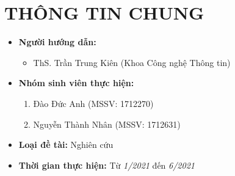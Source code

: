 \documentclass{article}[14pt]
\begin{document}
    \Large
    \section{THÔNG TIN CHUNG}
    \begin{itemize}[label = {}]
        
        \item \textbf{Người hướng dẫn:} 
        \begin{itemize}
            \item ThS. Trần Trung Kiên (Khoa Công nghệ Thông tin)
        \end{itemize}{}
    
        
        \item \textbf{Nhóm sinh viên thực hiện:}
        
        \begin{enumerate}
        
            \item Đào Đức Anh (MSSV: 1712270)
            \item Nguyễn Thành Nhân (MSSV: 1712631)
            
        \end{enumerate}

        \item \textbf{Loại đề tài:} Nghiên cứu
        
        \item \textbf{Thời gian thực hiện:} Từ \textit{1/2021} đến 
\textit{6/2021}
        
        
    \end{itemize}
    
\end{document}
